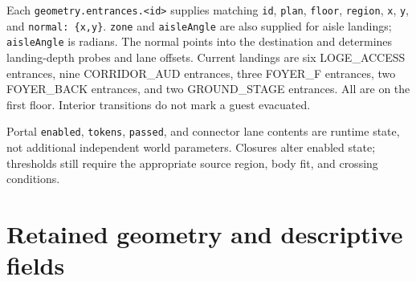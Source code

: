 \documentclass[11pt]{article}
\begin{document}
Each \texttt{geometry.\allowbreak{}entrances.\allowbreak{}<id>} supplies matching \texttt{id}, \texttt{plan}, \texttt{floor}, \texttt{region}, \texttt{x}, \texttt{y}, and \texttt{normal:\allowbreak{} \{x,\allowbreak{}y\}}. \texttt{zone} and \texttt{aisle\allowbreak{}Angle} are also supplied for aisle landings; \texttt{aisle\allowbreak{}Angle} is radians. The normal points into the destination and determines landing-depth probes and lane offsets. Current landings are six LOGE\_ACCESS entrances, nine CORRIDOR\_AUD entrances, three FOYER\_F entrances, two FOYER\_BACK entrances, and two GROUND\_STAGE entrances. All are on the first floor. Interior transitions do not mark a guest evacuated.


Portal \texttt{enabled}, \texttt{tokens}, \texttt{passed}, and connector lane contents are runtime state, not additional independent world parameters. Closures alter enabled state; thresholds still require the appropriate source region, body fit, and crossing conditions.


\section{Retained geometry and descriptive fields}
\end{document}
